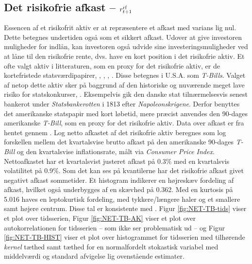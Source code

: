 \documentclass[
  a4paper,
  oneside]{memoir}
\begin{document}
\hypertarget{det-risikofrie-afkast-r_t1textnormalrf}{%
\subsection{\texorpdfstring{Det risikofrie afkast -- \(r_{t+1}^{\textnormal{rf}}\)}{Det risikofrie afkast -- r\_\{t+1\}\^{}\{\textbackslash textnormal\{rf\}\}}}\label{det-risikofrie-afkast-r_t1textnormalrf}}

Essencen af et risikofrit aktiv er at repræsentere et afkast med varians lig nul. Dette betegnes undertiden også som et sikkert afkast. Udover at give investoren muligheder for indlån, kan investoren også udvide sine investeringsmuligheder ved at låne til den risikofrie rente, dvs. have en kort position i det risikofrie aktiv. Et ofte valgt aktiv i litteraturen, som en proxy for det risikofrie aktiv, er de kortefristede statsværdipapirer, \citep{CampVic2003, CampVic1999}, \citep{JurVic2011}, \citep{Engsted2012}, \citep{CampVicCha2003}. Disse betegnes i U.S.A. som \emph{T-Bills}. Valget af netop dette aktiv sker på baggrund af den historiske og nuværende meget lave risiko for statskonkurser, \citep{Beers2017}. Eksempelvis gik den danske stat tilnærmelsesvis senest bankerot under \emph{Statsbankerotten} i 1813 efter \emph{Napoleonskrigene}. Derfor benyttes det amerikanske statspapir med kort løbetid, mere præcist anvendes den 90-dages amerikanske \emph{T-Bill}, som en proxy for det risikofrie aktiv. Data over afkast er fra \citep{CRSPt90} hentet gennem \citep{WRDSt90}. Log netto afkastet af det risikofrie aktiv beregnes som log forskellen mellem det kvartalsvise brutto afkast på den amerikanske 90-dages \emph{T-Bill} og den kvartalsvise inflationsrate, målt via \emph{Consumer Price Index}. Nettoafkastet har et kvartalsvist justeret afkast på 0.3\(\%\) med en kvartalsvis volatilitet på 0.9\(\%\). Som det kan ses på kvantilerne har det risikofrie afkast givet negativt afkast sommetider. Et histogram indikerer en højreskæv fordeling af afkast, hvilket også underbygges af en skævhed på 0.362. Med en kurtosis på 5.016 haves en leptokurtisk fordeling, med tykkere/længere haler og et smallere samt højere centrum. Disse tal er konsistente med \citep{CampVic2003}. Figur \ref{fig:NET-TB-tids} viser et plot over tidsserien, Figur \ref{fig:NET-TB-AK} viser et plot over autokorrelationen for tidsserien -- som ikke ser problematisk ud -- og Figur \ref{fig:NET-TB-HIST} viser et plot over histogrammet for tidsserien med tilhørende \emph{kernel} tæthed samt tæthed for en normalfordelt stokastisk variabel med middelværdi og standard afvigelse lig ovenstående estimater.
\end{document}

